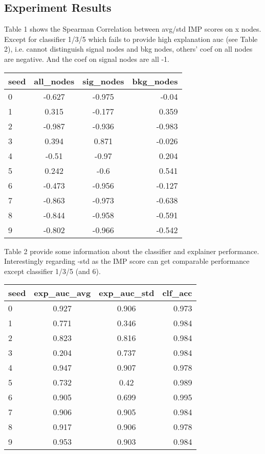 \documentclass[portrait]{poster}%
\begin{document}
\begin{multicols}{2}
\section*{Experiment Results}%
\label{sec:ExperimentResults}%
Table 1 shows the Spearman Correlation between avg/std IMP scores on x nodes. Except for classifier 1/3/5 
which fails to provide high explanation auc (see Table 2), i.e. cannot distinguish signal nodes and bkg nodes, others' coef 
on all nodes are negative. And the coef on signal nodes are all -1.%
\begin{center}%
%
\setlength{\tabcolsep}{1cm}%
\begin{tabular}{@{}lccr@{}}%
\toprule%
seed&all\_nodes&sig\_nodes&bkg\_nodes\\%
\midrule%
0&{-}0.627&{-}0.975&{-}0.04\\%
1&0.315&{-}0.177&0.359\\%
2&{-}0.987&{-}0.936&{-}0.983\\%
3&0.394&0.871&{-}0.026\\%
4&{-}0.51&{-}0.97&0.204\\%
5&0.242&{-}0.6&0.541\\%
6&{-}0.473&{-}0.956&{-}0.127\\%
7&{-}0.863&{-}0.973&{-}0.638\\%
8&{-}0.844&{-}0.958&{-}0.591\\%
9&{-}0.802&{-}0.966&{-}0.542\\\bottomrule%
%
\end{tabular}%
\end{center}%
Table 2 provide some information about the classifier and explainer performance. Interestingly regarding -std as the IMP score can get comparable performance except classifier 1/3/5 (and 6). %
\begin{center}%
%
\setlength{\tabcolsep}{1cm}%
\begin{tabular}{@{}lccr@{}}%
\toprule%
seed&exp\_auc\_avg&exp\_auc\_std&clf\_acc\\%
\midrule%
0&0.927&0.906&0.973\\%
1&0.771&0.346&0.984\\%
2&0.823&0.816&0.984\\%
3&0.204&0.737&0.984\\%
4&0.947&0.907&0.978\\%
5&0.732&0.42&0.989\\%
6&0.905&0.699&0.995\\%
7&0.906&0.905&0.984\\%
8&0.917&0.906&0.978\\%
9&0.953&0.903&0.984\\\bottomrule%
%
\end{tabular}%
\end{center}

%
\end{multicols}%
\end{document}
